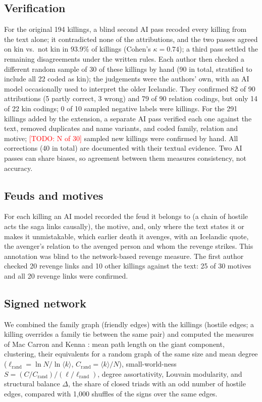 \documentclass[9pt,twocolumn,twoside]{pnas-new}
\newcommand{\TODO}[1]{\textcolor{red}{[TODO: #1]}}
\begin{document}
{\subsection*{Verification}
For the original 194 killings, a blind second AI pass recoded every killing from the text alone; it contradicted none of the attributions, and the two passes agreed on kin vs.\ not kin in 93.9\% of killings (Cohen's $\kappa=0.74$); a third pass settled the remaining disagreements under the written rules. Each author then checked a different random sample of 30 of these killings by hand (90 in total, stratified to include all 22 coded as kin); the judgements were the authors' own, with an AI model occasionally used to interpret the older Icelandic. They confirmed 82 of 90 attributions (5 partly correct, 3 wrong) and 79 of 90 relation codings, but only 14 of 22 kin codings; 0 of 10 sampled negative labels were killings. For the 291 killings added by the extension, a separate AI pass verified each one against the text, removed duplicates and name variants, and coded family, relation and motive; \TODO{N of 30} sampled new killings were confirmed by hand. All corrections (40 in total) are documented with their textual evidence. Two AI passes can share biases, so agreement between them measures consistency, not accuracy.

\subsection*{Feuds and motives}
For each killing an AI model recorded the feud it belongs to (a chain of hostile acts the saga links causally), the motive, and, only where the text states it or makes it unmistakable, which earlier death it avenges, with an Icelandic quote, the avenger's relation to the avenged person and whom the revenge strikes. This annotation was blind to the network-based revenge measure. The first author checked 20 revenge links and 10 other killings against the text: 25 of 30 motives and all 20 revenge links were confirmed.

\subsection*{Signed network}
We combined the family graph (friendly edges) with the killings (hostile edges; a killing overrides a family tie between the same pair) and computed the measures of Mac Carron and Kenna \cite{maccarron2013}: mean path length on the giant component, clustering, their equivalents for a random graph of the same size and mean degree ($\ell_{\mathrm{rand}}=\ln N/\ln\langle k\rangle$, $C_{\mathrm{rand}}=\langle k\rangle/N$), small-world-ness $S=(C/C_{\mathrm{rand}})/(\ell/\ell_{\mathrm{rand}})$, degree assortativity, Louvain modularity, and structural balance $\Delta$, the share of closed triads with an odd number of hostile edges, compared with 1{,}000 shuffles of the signs over the same edges.

}
\end{document}
